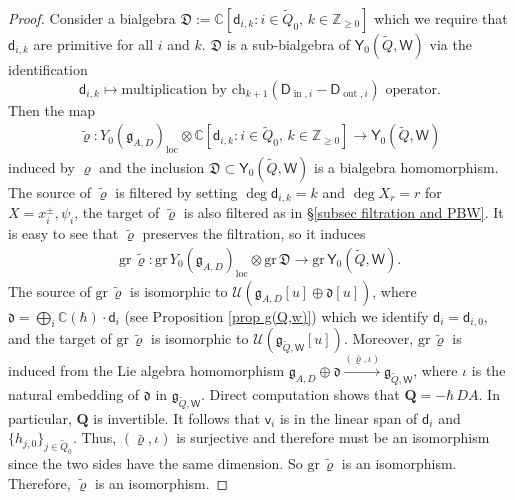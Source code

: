 \documentclass[10pt]{amsart}
\theoremstyle{definition}
\numberwithin{equation}{section}
\newcommand{\bC}{\mathbb{C}}
\newcommand{\bZ}{\mathbb{Z}}
\newcommand{\loc}{\mathrm{loc}}
\newcommand{\sW}{\mathsf{W}}
\newcommand{\In}{\operatorname{in}}
\newcommand{\Out}{\operatorname{out}}
\begin{document}
\begin{proof}
Consider a bialgebra $\mathfrak{D}:=\bC[\mathsf d_{i,k}: i\in \widetilde{Q}_0,\, k\in \bZ_{\geqslant 0}]$ which we require that $\mathsf d_{i,k}$ are primitive for all $i$ and $k$. $\mathfrak{D}$ is a sub-bialgebra of $\mathsf Y_0(\widetilde{Q},\sW)$ via the identification 
$$\mathsf d_{i,k}\mapsto \mathrm{multiplication}\, \,\mathrm{by}\,\, \mathrm{ch}_{k+1}(\mathsf D_{\In,i}-\mathsf D_{\Out,i})\,\,\mathrm{operator}. $$ 
Then the map 
\begin{align*}
\widetilde{\varrho}\colon Y_{0}(\mathfrak{g}_{A,D})_{\loc}\otimes \bC[\mathsf d_{i,k}: i\in \widetilde{Q}_0,\, k\in \bZ_{\geqslant 0}]\to \mathsf Y_0(\widetilde{Q},\sW)
\end{align*}
induced by $\varrho$ and the inclusion $\mathfrak{D}\subset \mathsf Y_0(\widetilde{Q},\sW)$ is a bialgebra homomorphism. The source of $\widetilde{\varrho}$ is filtered by setting $\deg \mathsf d_{i,k}=k$ and $\deg X_{r}=r$ for $X=x^\pm_i,\psi_i$, the target of $\widetilde{\varrho}$ is also filtered as in \S \ref{subsec filtration and PBW}. It is easy to see that $\widetilde{\varrho}$ preserves the filtration, so it induces
\begin{align*}
\mathrm{gr}\,\widetilde{\varrho}\colon \mathrm{gr}\,Y_{0}(\mathfrak{g}_{A,D})_{\loc}\otimes \mathrm{gr}\,\mathfrak{D}\to \mathrm{gr}\,\mathsf Y_0(\widetilde{Q},\sW).
\end{align*}
The source of $\mathrm{gr}\,\widetilde{\varrho}$ is isomorphic to $\mathcal U(\mathfrak{g}_{A,D}[u]\oplus \mathfrak{d}[u])$, where $\mathfrak{d}=\bigoplus_i \bC(\hbar)\cdot\mathsf d_i$ (see Proposition \ref{prop g(Q,w)}) which we identify $\mathsf d_i=\mathsf d_{i,0}$, and the target of $\mathrm{gr}\,\widetilde{\varrho}$ is isomorphic to $\mathcal U(\mathfrak{g}_{\widetilde{Q},\sW}[u])$. Moreover, $\mathrm{gr}\,\widetilde{\varrho}$ is induced from the Lie algebra homomorphism $\mathfrak{g}_{A,D}\oplus \mathfrak{d}\xrightarrow{(\bar{\varrho},\iota)} \mathfrak{g}_{\widetilde{Q},\sW}$, where $\iota$ is the natural embedding of $\mathfrak{d}$ in $\mathfrak{g}_{\widetilde{Q},\sW}$.
Direct computation shows that $\pmb Q=-\hbar \,DA$. In particular, $\pmb Q$ is invertible. It follows that $\mathsf v_i$ is in the linear span of $\mathsf d_i$ and $\{h_{j,0}\}_{j\in \widetilde{Q}_0}$. Thus, $(\bar{\varrho},\iota)$ is surjective and therefore must be an isomorphism since the two sides have the same dimension. So $\mathrm{gr}\,\widetilde{\varrho}$ is an isomorphism. Therefore, $\widetilde{\varrho}$ is an isomorphism.
\end{proof}
\end{document}
